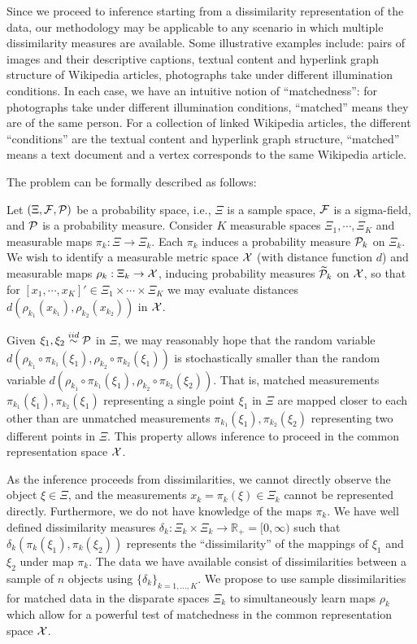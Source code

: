 \documentclass[12pt,oneside,final]{thesis}\usepackage[]{graphicx}\usepackage[]{color}
\begin{document}
		Since we proceed to inference starting from a dissimilarity representation of the data, our methodology may be applicable to any scenario in which multiple dissimilarity measures are available.  Some illustrative examples include:  pairs of images and their descriptive captions,  textual content  and  hyperlink graph
structure of  Wikipedia  articles, photographs take under different illumination conditions. In each case, we have an intuitive notion of ``matchedness'': for photographs take under different illumination conditions, ``matched'' means they are of the same person. For a collection of linked Wikipedia articles, the different ``conditions''  are  the textual content and hyperlink graph structure, ``matched'' means a text document and  a vertex  corresponds to the same Wikipedia article. 

 
The problem can be formally described as follows:


Let $(\Xi,\mathcal{F},\mathcal{P})$ be a probability space,
i.e., $\Xi$ is a sample space, $\mathcal{F}$ is a sigma-field,
and $\mathcal{P}$ is a probability measure.
Consider $K$ measurable spaces $\Xi_1,\cdots,\Xi_K$ 
and measurable maps $\pi_k:\Xi \to \Xi_k$.
Each $\pi_k$ induces a probability measure $\mathcal{P}_k$ on $\Xi_k$.
We wish to identify a measurable metric space $\mathcal{X}$
(with distance function $d$)
and measurable maps $\rho_k: \Xi_k \to \mathcal{X}$,
inducing probability measures $\widetilde{\mathcal{P}}_k$ on $\mathcal{X}$,
so that for $[x_1,\cdots,x_K]' \in \Xi_1 \times \cdots \times \Xi_K$
we may evaluate distances $d(\rho_{k_1}(x_{k_1}),\rho_{k_2}(x_{k_2}))$ in $\mathcal{X}$.


Given $\xi_1,\xi_2 \stackrel{iid}{\sim} \mathcal{P}$ in $\Xi$,
we may reasonably hope that the random variable
$d(\rho_{k_1}\circ\pi_{k_1}(\xi_1),\rho_{k_2}\circ\pi_{k_2}(\xi_1))$
is stochastically smaller than the random variable
$d(\rho_{k_1}\circ\pi_{k_1}(\xi_1),\rho_{k_2}\circ\pi_{k_2}(\xi_2))$.
That is, matched measurements 
$\pi_{k_1}(\xi_1),\pi_{k_2}(\xi_1)$
representing a single point $\xi_1$ in $\Xi$
are mapped closer to each other than are
unmatched measurements 
$\pi_{k_1}(\xi_1),\pi_{k_2}(\xi_2)$
representing two different points in $\Xi$.
This property allows inference to proceed in the common representation space $\mathcal{X}$.


As the inference proceeds from dissimilarities, we cannot directly observe the object
 $\xi \in \Xi$,  and the measurements $x_k = \pi_k(\xi) \in \Xi_k$ cannot be represented directly. Furthermore, we do not have knowledge of the maps $\pi_k$.
 We have well defined dissimilarity measures
$\delta_k:\Xi_k \times \Xi_k \to \mathbb{R}_+ = [0,\infty)$
such that $\delta_k( \pi_k(\xi_1) , \pi_k(\xi_2) )$
represents the ``dissimilarity'' of  the mappings of $\xi_1$ and $\xi_2$
under map $\pi_k$.
The data we have  available consist of dissimilarities between a sample of $n$ objects using $\{\delta_k\}_{k=1,\ldots,K}$.
We propose to use sample dissimilarities for matched data in the disparate spaces $\Xi_k$
to simultaneously learn maps $\rho_k$ which allow for a powerful test of matchedness
in the common representation space $\mathcal{X}$.
\end{document}
